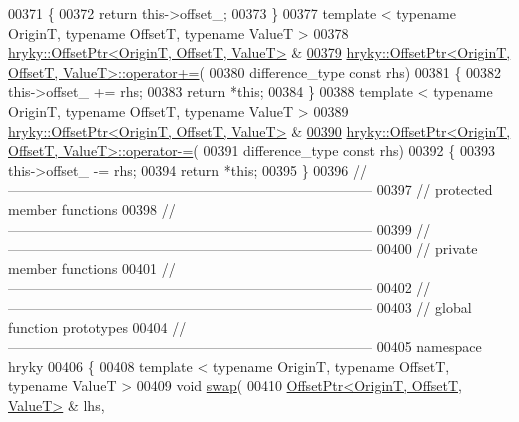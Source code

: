 \begin{DoxyCode}
00371 \textcolor{keyword}{}\{
00372     \textcolor{keywordflow}{return} this->offset\_;
00373 \}
00377 \textcolor{keyword}{template} < \textcolor{keyword}{typename} OriginT, \textcolor{keyword}{typename} OffsetT, \textcolor{keyword}{typename} ValueT >
00378 \hyperlink{classhryky_1_1_offset_ptr}{hryky::OffsetPtr<OriginT, OffsetT, ValueT>} & 
\hypertarget{offset__ptr_8h_source_l00379}{}\hyperlink{classhryky_1_1_offset_ptr_a1f855447fc5886b2518be1f89d9f686b}{00379} \hyperlink{classhryky_1_1_offset_ptr}{hryky::OffsetPtr<OriginT, OffsetT, ValueT>::operator+=}(
00380     difference\_type \textcolor{keyword}{const} rhs)
00381 \{
00382     this->offset\_ += rhs;
00383     \textcolor{keywordflow}{return} *\textcolor{keyword}{this};
00384 \}
00388 \textcolor{keyword}{template} < \textcolor{keyword}{typename} OriginT, \textcolor{keyword}{typename} OffsetT, \textcolor{keyword}{typename} ValueT >
00389 \hyperlink{classhryky_1_1_offset_ptr}{hryky::OffsetPtr<OriginT, OffsetT, ValueT>} & 
\hypertarget{offset__ptr_8h_source_l00390}{}\hyperlink{classhryky_1_1_offset_ptr_a5dcfac7df68c6d273ca319a8cc79352d}{00390} \hyperlink{classhryky_1_1_offset_ptr}{hryky::OffsetPtr<OriginT, OffsetT, ValueT>::operator-=}(
00391     difference\_type \textcolor{keyword}{const} rhs)
00392 \{
00393     this->offset\_ -= rhs;
00394     \textcolor{keywordflow}{return} *\textcolor{keyword}{this};
00395 \}
00396 \textcolor{comment}{//
      ------------------------------------------------------------------------------}
00397 \textcolor{comment}{// protected member functions}
00398 \textcolor{comment}{//
      ------------------------------------------------------------------------------}
00399 \textcolor{comment}{//
      ------------------------------------------------------------------------------}
00400 \textcolor{comment}{// private member functions}
00401 \textcolor{comment}{//
      ------------------------------------------------------------------------------}
00402 \textcolor{comment}{//
      ------------------------------------------------------------------------------}
00403 \textcolor{comment}{// global function prototypes}
00404 \textcolor{comment}{//
      ------------------------------------------------------------------------------}
00405 \textcolor{keyword}{namespace }hryky
00406 \{
00408     \textcolor{keyword}{template} < \textcolor{keyword}{typename} OriginT, \textcolor{keyword}{typename} OffsetT, \textcolor{keyword}{typename} ValueT >
00409     \textcolor{keywordtype}{void} \hyperlink{namespacehryky_a4282146df5ea2b68cb667896a2205909}{swap}(
00410         \hyperlink{classhryky_1_1_offset_ptr}{OffsetPtr<OriginT, OffsetT, ValueT>} & lhs,

\end{DoxyCode}
